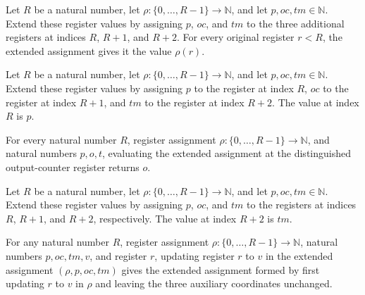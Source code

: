 \begin{lemma}
\label{Complexity.CPSim.ev_rg}
\leanok
{}
Let $R$ be a natural number, let $\rho:\{0,\ldots,R-1\}\to\mathbb{N}$, and let
$p,oc,tm\in\mathbb{N}$. Extend these register values by assigning $p$, $oc$, and $tm$ to
the three additional registers at indices $R$, $R+1$, and $R+2$. For every original
register $r<R$, the extended assignment gives it the value $\rho(r)$.
\end{lemma}

\begin{lemma}
\label{Complexity.CPSim.ev_rP}
\leanok
{}
Let $R$ be a natural number, let $\rho:\{0,\ldots,R-1\}\to\mathbb{N}$, and let
$p,oc,tm\in\mathbb{N}$. Extend these register values by assigning $p$ to the register at
index $R$, $oc$ to the register at index $R+1$, and $tm$ to the register at index $R+2$.
The value at index $R$ is $p$.
\end{lemma}

\begin{lemma}
\label{Complexity.CPSim.ev_rO}
\leanok
{}
For every natural number $R$, register assignment $\rho:\{0,\ldots,R-1\}\to\mathbb{N}$,
and natural numbers $p,o,t$, evaluating the extended assignment at the distinguished
output-counter register returns $o$.
\end{lemma}

\begin{lemma}
\label{Complexity.CPSim.ev_rT}
\leanok
{}
Let $R$ be a natural number, let $\rho:\{0,\ldots,R-1\}\to\mathbb{N}$, and let
$p,oc,tm\in\mathbb{N}$. Extend these register values by assigning $p$, $oc$, and $tm$ to
the registers at indices $R$, $R+1$, and $R+2$, respectively. The value at index $R+2$
is $tm$.
\end{lemma}

\begin{lemma}
\label{Complexity.CPSim.upd_rg}
\leanok
{}
For any natural number $R$, register assignment $\rho:\{0,\ldots,R-1\}\to\mathbb N$,
natural numbers $p,oc,tm,v$, and register $r$, updating register $r$ to $v$ in the
extended assignment $(\rho,p,oc,tm)$ gives the extended assignment formed by first
updating $r$ to $v$ in $\rho$ and leaving the three auxiliary coordinates unchanged.
\end{lemma}

